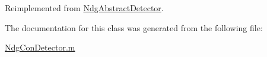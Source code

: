 Reimplemented from \hyperlink{class_ndg_abstract_detector_a90e497a5af4d9e97af0f39960131b4ec}{Ndg\+Abstract\+Detector}.



The documentation for this class was generated from the following file\+:\begin{DoxyCompactItemize}
\item 
\hyperlink{_ndg_con_detector_8m}{Ndg\+Con\+Detector.\+m}\end{DoxyCompactItemize}
